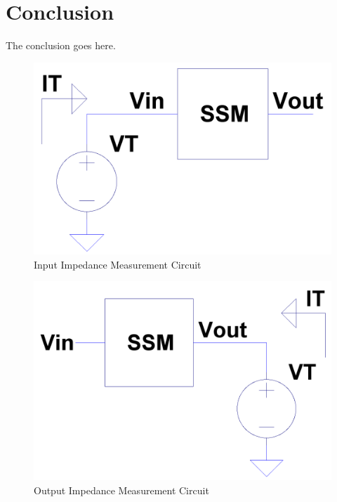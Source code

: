 \documentclass[conference]{IEEEtran}
\begin{document}
\section{Conclusion}
The conclusion goes here.

\appendix
\label{app:A}
\begin{figure}[!htbp]
  	\centering
  	\includegraphics[scale=0.15]{images/input-z-meas.png}
  	\caption[input-z-meas]{Input Impedance Measurement Circuit}
  	\label{fig:input-z-meas}
	\end{figure}

\begin{figure}[!htbp]
  	\centering
  	\includegraphics[scale=0.15]{images/output-z-meas.png}
  	\caption[output-z-meas]{Output Impedance Measurement Circuit}
  	\label{fig:output-z-meas}
	\end{figure}
\end{document}
